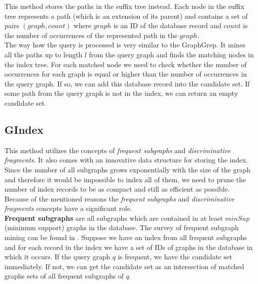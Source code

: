 This method stores the paths in the suffix tree instead. Each node in the suffix tree represents a path (which is an extension of its parent) and contains a set of pairs $(graph, count)$ where $graph$ is an ID of the database record and $count$ is the number of occurrences of the represented path in the $graph$.\\

The way how the query is processed is very similar to the GraphGrep. It mines all the paths up to length $l$ from the query graph and finds the matching nodes in the index tree. For each matched node we need to check whether the number of occurrences for each graph is equal or higher than the number of occurrences in the query graph. If so, we can add this database record into the candidate set. If some path from the query graph is not in the index, we can return an empty candidate set.

\subsection{GIndex}

This method utilizes the concepts of \textit{frequent subgraphs} and \textit{discriminative fragments}. It also comes with an innovative data structure for storing the index.\\

Since the number of all subgraphs grows exponentially with the size of the graph and therefore it would be impossible to index all of them, we need to prune the number of index records to be as compact and still as efficient as possible.\\

Because of the mentioned reasons the \textit{frequent subgraphs} and \textit{discriminative fragments} concepts have a significant role.\\

\textbf{Frequent subgraphs} are all subgraphs which are contained in at least \linebreak $ minSup $ (minimum support) graphs in the database. The survey of frequent subgraph mining can be found in \cite{frequentGraphs}. Suppose we have an index from all frequent subgraphs and for each record in the index we have a set of IDs of graphs in the database in which it occurs. If the query graph $ q $ is frequent, we have the candidate set immediately. If not, we can get the candidate set as an intersection of matched graphs sets of all frequent subgraphs of $ q $.\\

